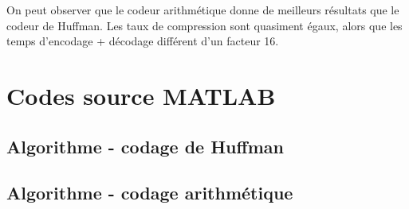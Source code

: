 \documentclass[a4paper, 12pt]{article}
\newcommand{\FSource}[1]{%

}
\begin{document}
On peut observer que le codeur arithmétique donne de meilleurs résultats que le codeur de Huffman. Les taux de compression sont quasiment égaux, alors que les temps d'encodage + décodage différent d'un facteur 16.

\clearpage
\appendix

\section{Codes source MATLAB}
\subsection{Algorithme - codage de Huffman}\label{algohuffman}

\FSource{../huffman.m}

\newpage
\subsection{Algorithme - codage arithmétique}\label{algoarithmetique}

\FSource{../arith.m}
\end{document}
